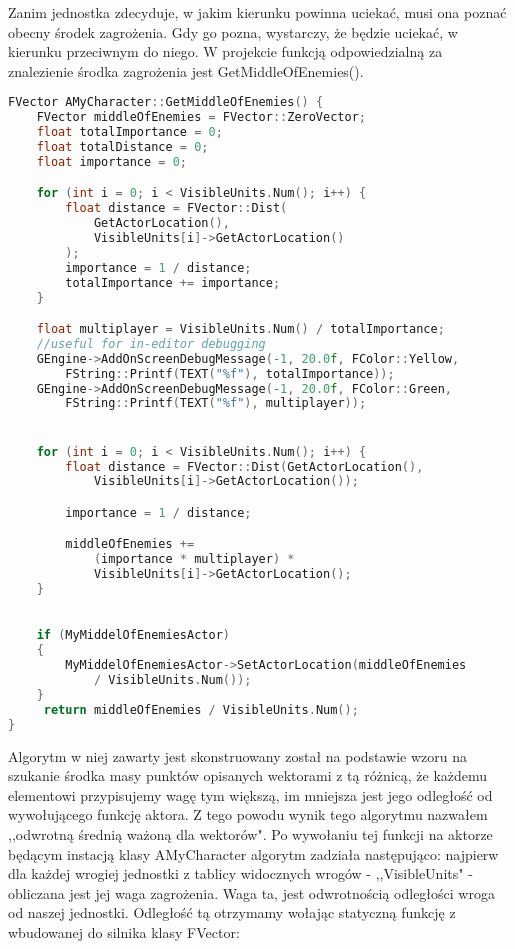 \documentclass[12pt]{report}
\begin{document}
Zanim jednostka zdecyduje, w jakim kierunku powinna uciekać, musi ona poznać obecny środek zagrożenia. Gdy go pozna, wystarczy, że będzie uciekać, w kierunku przeciwnym do niego. W projekcie funkcją odpowiedzialną za znalezienie środka zagrożenia jest GetMiddleOfEnemies().

\begin{lstlisting}[language=C++, backgroundcolor=\color{black!5}, basicstyle=\footnotesize, caption=Funkcja GetMiddleOfEnemies() w klasie AMyCharacter]
FVector AMyCharacter::GetMiddleOfEnemies() {
	FVector middleOfEnemies = FVector::ZeroVector;
	float totalImportance = 0;		
	float totalDistance = 0;
	float importance = 0;

	for (int i = 0; i < VisibleUnits.Num(); i++) {
		float distance = FVector::Dist(
		    GetActorLocation(), 
		    VisibleUnits[i]->GetActorLocation()
		);
		importance = 1 / distance;
		totalImportance += importance;
	}

	float multiplayer = VisibleUnits.Num() / totalImportance;
	//useful for in-editor debugging
	GEngine->AddOnScreenDebugMessage(-1, 20.0f, FColor::Yellow, 
	    FString::Printf(TEXT("%f"), totalImportance));
	GEngine->AddOnScreenDebugMessage(-1, 20.0f, FColor::Green, 
	    FString::Printf(TEXT("%f"), multiplayer));


	for (int i = 0; i < VisibleUnits.Num(); i++) {
		float distance = FVector::Dist(GetActorLocation(), 
		    VisibleUnits[i]->GetActorLocation());

		importance = 1 / distance;

		middleOfEnemies += 
		    (importance * multiplayer) *  
		    VisibleUnits[i]->GetActorLocation();
	}

	
	if (MyMiddelOfEnemiesActor)
	{
		MyMiddelOfEnemiesActor->SetActorLocation(middleOfEnemies 
		    / VisibleUnits.Num());
	}
	 return middleOfEnemies / VisibleUnits.Num();
}
\end{lstlisting}

Algorytm w niej zawarty jest skonstruowany został na podstawie wzoru na szukanie środka masy punktów opisanych wektorami z tą różnicą, że każdemu elementowi przypisujemy wagę tym większą, im mniejsza jest jego odległość od wywołującego funkcję aktora. Z tego powodu wynik tego algorytmu nazwałem ,,odwrotną średnią ważoną dla wektorów". Po wywołaniu tej funkcji na aktorze będącym instacją klasy AMyCharacter algorytm zadziała następująco:
najpierw dla każdej wrogiej jednostki z tablicy widocznych wrogów - ,,VisibleUnits" - obliczana jest jej waga zagrożenia. Waga ta, jest odwrotnością odległości wroga od naszej jednostki. Odległość tą otrzymamy wołając statyczną funkcję z wbudowanej do silnika klasy FVector:
\end{document}
